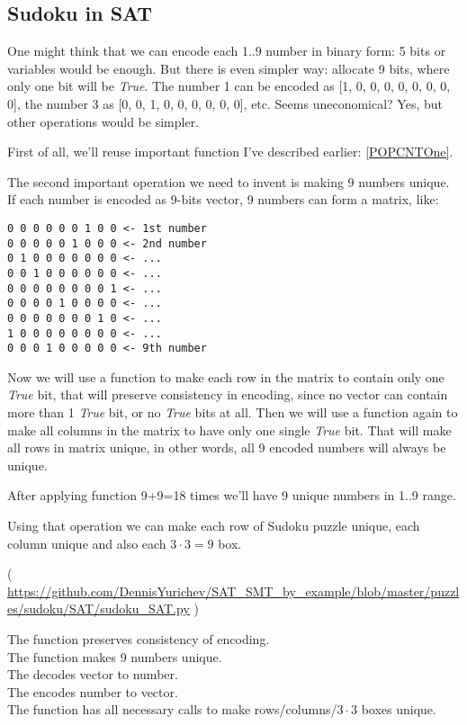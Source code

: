 \subsection{Sudoku in SAT}
\label{Sudoku_SAT}

One might think that we can encode each 1..9 number in binary form: 5 bits or variables would be enough.
But there is even simpler way: allocate 9 bits, where only one bit will be \textit{True}.
The number 1 can be encoded as [1, 0, 0, 0, 0, 0, 0, 0, 0], the number 3 as [0, 0, 1, 0, 0, 0, 0, 0, 0], etc.
Seems uneconomical? Yes, but other operations would be simpler.

First of all, we'll reuse important  function I've described earlier: \ref{POPCNTOne}.

The second important operation we need to invent is making 9 numbers unique.
If each number is encoded as 9-bits vector, 9 numbers can form a matrix, like:

\begin{lstlisting}
0 0 0 0 0 0 1 0 0 <- 1st number
0 0 0 0 0 1 0 0 0 <- 2nd number
0 1 0 0 0 0 0 0 0 <- ...
0 0 1 0 0 0 0 0 0 <- ...
0 0 0 0 0 0 0 0 1 <- ...
0 0 0 0 1 0 0 0 0 <- ...
0 0 0 0 0 0 0 1 0 <- ...
1 0 0 0 0 0 0 0 0 <- ...
0 0 0 1 0 0 0 0 0 <- 9th number
\end{lstlisting}

Now we will use a  function to make each row in the matrix to contain only one \textit{True} bit, that will
preserve consistency in encoding, since no vector can contain more than 1 \textit{True} bit, or no \textit{True} bits at all.
Then we will use a  function again to make all columns in the matrix to have only one single \textit{True} bit.
That will make all rows in matrix unique, in other words, all 9 encoded numbers will always be unique.

After applying  function 9+9=18 times we'll have 9 unique numbers in 1..9 range.

Using that operation we can make each row of Sudoku puzzle unique, each column unique and also each $3 \cdot 3=9$ box.


( \url{https://github.com/DennisYurichev/SAT_SMT_by_example/blob/master/puzzles/sudoku/SAT/sudoku_SAT.py} )

The  function preserves consistency of encoding.\\
The  function makes 9 numbers unique.\\
The  decodes vector to number.\\
The  encodes number to vector.\\
The  function has all necessary calls to make rows/columns/$3\cdot 3$ boxes unique.

